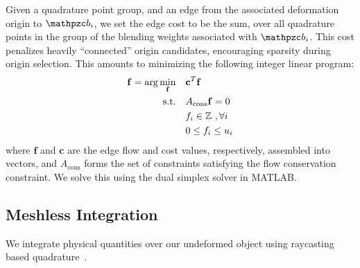 Given a quadrature point group, and an edge from the associated deformation origin to $\prt_i$, we set the edge cost to be the sum, 
over all quadrature points in the group of the blending weights associated with $\prt_i$.
This cost penalizes heavily ``connected'' origin candidates, encouraging sparsity during origin selection. 
This amounts to minimizing the following integer linear program:
\begin{equation}
\begin{aligned}
\mathbf{f} =  \arg\min_{\mathbf{f}} \quad & \mathbf{c}^T \mathbf{f}    \\
\textrm{s.t.} \quad & A_{\text{cons}} \mathbf{f} = 0  \\
                  & f_i \in \mathbb{Z} \mbox{ }, \forall i	\\
                  & 0 \leq f_i \leq u_i
\end{aligned}
\end{equation}
where $\mathbf{f}$ and $\mathbf{c}$ are the edge flow and cost values, respectively, assembled into vectors, and $A_{\text{cons}}$ forms the set of constraints satisfying the flow conservation constraint. 
We solve this using the dual simplex solver in MATLAB.

\subsection{Meshless Integration}
\label{sec:quadrature}
We integrate physical quantities over our undeformed object using raycasting based quadrature~\cite{KHOSRAVIFARD201030}.


